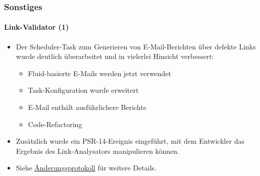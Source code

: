 %

\begin{frame}[fragile]
	\frametitle{Sonstiges}
	\framesubtitle{Link-Validator (1)}


	\begin{itemize}
		\item Der Scheduler-Task zum Generieren von E-Mail-Berichten über defekte Links
			wurde deutlich überarbeitet und in vielerlei Hinsicht verbessert:

			\begin{itemize}
				\item Fluid-basierte E-Mails werden jetzt verwendet
				\item Task-Konfiguration wurde erweitert
				\item E-Mail enthält ausführlichere Berichte
				\item Code-Refactoring
			\end{itemize}

		\item Zusätzlich wurde ein PSR-14-Ereignis eingeführt, mit dem Entwickler
			das Ergebnis des Link-Analysators manipulieren können.

		\item Siehe \href{https://docs.typo3.org/c/typo3/cms-core/master/en-us/Changelog/11.0/Feature-29342-ImproveValidatorTask.html}{Änderungsprotokoll}
			für weitere Details.

	\end{itemize}

\end{frame}

